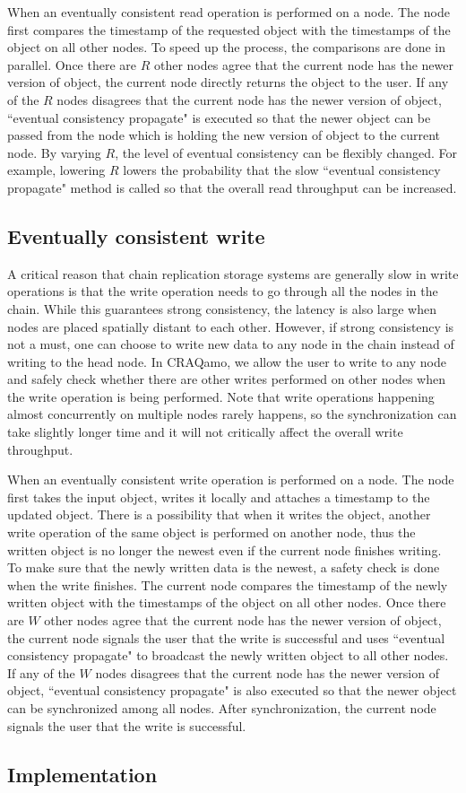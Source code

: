 When an eventually consistent read operation is performed on a node. The node first compares the timestamp of the requested object with the timestamps of the object on all other nodes. To speed up the process, the comparisons are done in parallel. Once there are $R$ other nodes agree that the current node has the newer version of object, the current node directly returns the object to the user. If any of the $R$ nodes disagrees that the current node has the newer version of object, ``eventual consistency propagate" is executed so that the newer object can be passed from the node which is holding the new version of object to the current node. By varying $R$, the level of eventual consistency can be flexibly changed. For example, lowering $R$ lowers the probability that the slow ``eventual consistency propagate" method is called so that the overall read throughput can be increased.

\subsection{Eventually consistent write}
A critical reason that chain replication storage systems are generally slow in write operations is that the write operation needs to go through all the nodes in the chain. While this guarantees strong consistency, the latency is also large when nodes are placed spatially distant to each other. However, if strong consistency is not a must, one can choose to write new data to any node in the chain instead of writing to the head node. In CRAQamo, we allow the user to write to any node and safely check whether there are other writes performed on other nodes when the write operation is being performed. Note that write operations happening almost concurrently on multiple nodes rarely happens, so the synchronization can take slightly longer time and it will not critically affect the overall write throughput.

When an eventually consistent write operation is performed on a node. The node first takes the input object, writes it locally and attaches a timestamp to the updated object. There is a possibility that when it writes the object, another write operation of the same object is performed on another node, thus the written object is no longer the newest even if the current node finishes writing. To make sure that the newly written data is the newest, a safety check is done when the write finishes. The current node compares the timestamp of the newly written object with the timestamps of the object on all other nodes. Once there are $W$ other nodes agree that the current node has the newer version of object, the current node signals the user that the write is successful and uses ``eventual consistency propagate" to broadcast the newly written object to all other nodes. If any of the $W$ nodes disagrees that the current node has the newer version of object, ``eventual consistency propagate" is also executed so that the newer object can be synchronized among all nodes. After synchronization, the current node signals the user that the write is successful. 


\subsection{Implementation}

